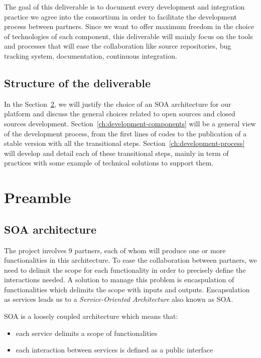 \documentclass{learnpad}
\begin{document}
The goal of this deliverable is to document every development and integration practice we agree
into the consortium in order to facilitate the development process between partners.
Since we want to offer maximum freedom in the choice of technologies of each component, this
deliverable will mainly focus on the tools and processes that will ease the collaboration like
source repositories, bug tracking system, documentation, continuous integration.

\section{Structure of the deliverable}
\label{sec:structure-of-the-deliverable}

In the Section~\ref{ch:preamble}, we will justify the choice of an SOA architecture for our
\learnpad platform and discuss the general choices related to open sources and closed sources
development. Section~\ref{ch:development-components} will be a general view of the development
process, from the first lines of codes to the publication of a stable version with all the
transitional steps. Section~\ref{ch:development-process} will develop and detail each of these
transitional steps, mainly in term of practices with some example of technical solutions to support
them.

\chapter{Preamble}
\label{ch:preamble}

\section{SOA architecture}
\label{sec:soa-architecture}

The \learnpad project involves 9 partners, each of whom will produce one or more functionalities
in this architecture. To ease the collaboration between partners, we need to delimit the scope
for each functionality in order to precisely define the interactions needed. A solution to manage
this problem is encaspulation of functionalities which delimits the scope with inputs and outputs.
Encapsulation as services leads us to a \emph{Service-Oriented Architecture} also known as SOA.

SOA is a loosely coupled architecture which means that:
\begin{itemize}
	\item each service delimits a scope of functionalities
	\item each interaction between services is defined as a public interface
\end{itemize}
\end{document}
